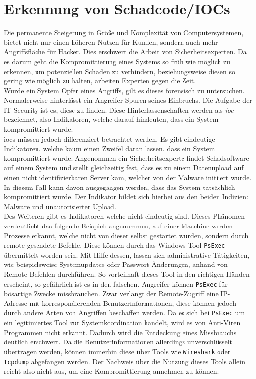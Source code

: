 \documentclass[
    12pt, %
    DIV10,
    ngerman, %
    a4paper, %
    oneside, %
    titlepage, %
    parskip=half, %
    headings=normal, %
    listof=totoc, %
    bibliography=totoc, %
    index=totoc, %
    captions=tableheading, %
    final %
]{scrreprt}
\begin{document}
\chapter{Erkennung von Schadcode/IOCs}\label{sec:ioc}
Die permanente Steigerung in Größe und Komplexität von Computersystemen, bietet nicht nur einen höheren Nutzen für Kunden, sondern auch mehr Angriffsfläche für Hacker. Dies erschwert die Arbeit von Sicherheitsexperten. Da es darum geht die Kompromittierung eines Systems so früh wie möglich zu erkennen, um potenziellen Schaden zu verhindern, beziehungsweise diesen so gering wie möglich zu halten, arbeiten Experten gegen die Zeit.\\
Wurde ein System Opfer eines Angriffs, gilt es dieses forensisch zu untersuchen. Normalerweise hinterlässt ein Angreifer Spuren seines Einbruchs. Die Aufgabe der IT-Security ist es, diese zu finden. Diese Hinterlassenschaften werden als \emph{\acf{ioc}} bezeichnet, also Indikatoren, welche darauf hindeuten, dass ein System kompromittiert wurde.\\
%
\ac{iocs} müssen jedoch differenziert betrachtet werden. Es gibt eindeutige Indikatoren, welche kaum einen Zweifel daran lassen, dass ein System kompromittiert wurde. Angenommen ein Sicherheitsexperte findet Schadsoftware auf einem System und stellt gleichzeitig fest, dass es zu einem Datenupload auf einen nicht identifizierbaren Server kam, welcher von der Malware initiiert wurde. In diesem Fall kann davon ausgegangen werden, dass das System tatsächlich kompromittiert wurde. Der Indikator bildet sich hierbei aus den beiden Indizien: Malware und unautorisierter Upload.\\
Des Weiteren gibt es Indikatoren welche nicht eindeutig sind. Dieses Phänomen verdeutlicht das folgende Beispiel: angenommen, auf einer Maschine werden Prozesse erkannt, welche nicht von dieser selbst gestartet wurden, sondern durch remote gesendete Befehle. Diese können durch das Windows Tool \texttt{PsExec} übermittelt worden sein. Mit Hilfe dessen, lassen sich administrative Tätigkeiten, wie beispielsweise Systemupdates oder Passwort Änderungen, anhand von Remote-Befehlen durchführen. So vorteilhaft dieses Tool in den richtigen Händen erscheint, so gefährlich ist es in den falschen. Angreifer können \texttt{PsExec} für bösartige Zwecke missbrauchen. Zwar verlangt der Remote-Zugriff eine IP-Adresse mit korrespondierenden Benutzerinformationen, diese können jedoch durch andere Arten von Angriffen beschaffen werden. Da es sich bei \texttt{PsExec} um ein legitimiertes Tool zur Systemkoordination handelt, wird es von Anti-Viren Programmen nicht erkannt. Dadurch wird die Entdeckung eines Missbrauchs deutlich erschwert. Da die Benutzerinformationen allerdings unverschlüsselt übertragen werden, können immerhin diese über Tools wie \texttt{Wireshark} oder \texttt{Tcpdump} abgefangen werden. Der Nachweis über die Nutzung dieses Tools allein reicht also nicht aus, um eine Kompromittierung annehmen zu können.
\end{document}
